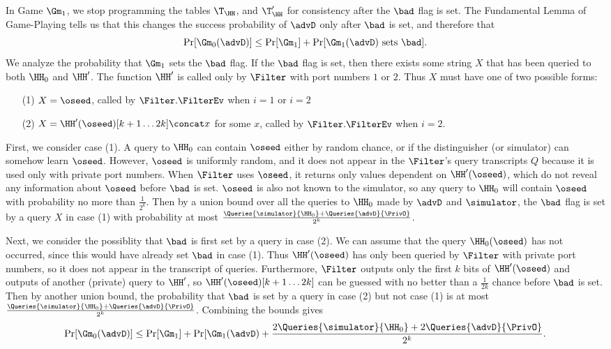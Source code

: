 	In Game $\Gm_1$, we stop programming the tables $\T_\HH$, and $\T_\HH^{\prime}$ for consistency after the $\bad$ flag is set.
	The Fundamental Lemma of Game-Playing tells us that this changes the success probability of $\advD$ only after $\bad$ is set, and therefore that
	\[ \Pr[\Gm_0(\advD)] \leq \Pr[\Gm_1] + \Pr[\Gm_1(\advD) \text{ sets } \bad]. \]
	We analyze the probability that $\Gm_1$ sets the $\bad$ flag.
	If the $\bad$ flag is set, then there exists some string $X$ that has been queried to both $\HH_0$ and $\HH^{\prime}$.
	The function $\HH^{\prime}$ is called only by $\Filter$ with port numbers $1$ or $2$.
	Thus $X$ must have one of two possible forms: 
	\begin{enumerate}
		\item[(1)] $X = \oseed$, called by $\Filter.\FilterEv$ when $i=1$ or $i = 2$
		\item[(2)] $X = \HH^{\prime}(\oseed)[k+1 \ldots 2k] \concat x$ for some $x$, called by $\Filter.\FilterEv$ when $i=2$.
	\end{enumerate}
	First, we consider case (1). A query to $\HH_0$ can contain $\oseed$ either by random chance, or if the distinguisher (or simulator) can somehow learn $\oseed$. 
	However, $\oseed$ is uniformly random, and it does not appear in the $\Filter$'s query transcripts $Q$ because it is used only with private port numbers. 
	When $\Filter$ uses $\oseed$, it returns only values dependent on $\HH^{\prime}(\oseed)$, which do not reveal any information about $\oseed$ before $\bad$ is set. 
	$\oseed$ is also not known to the simulator, so any query to $\HH_0$ will contain $\oseed$ with probability no more than $\frac{1}{2^{k}}$.
	Then by a union bound over all the queries to $\HH_0$ made by $\advD$ and $\simulator$, the $\bad$ flag is set by a query $X$ in case (1) with probability at most $\frac{\Queries{\simulator}{\HH_0} + \Queries{\advD}{\PrivO}}{2^k}$.
	
	Next, we consider the possiblity that $\bad$ is first set by a query in case (2). 
	We can assume that the query $\HH_0(\oseed)$ has not occurred, since this would have already set $\bad$ in case (1).
	Thus $\HH^{\prime}(\oseed)$ has only been queried by $\Filter$ with private port numbers, so it does not appear in the transcript of queries.
	Furthermore, $\Filter$ outputs only the first $k$ bits of $\HH^{\prime}(\oseed)$ and outputs of another (private) query to $\HH^{\prime}$, so $\HH^{\prime}(\oseed)[k+1 \ldots 2k]$ can be guessed with no better than a $\frac{1}{2k}$ chance before $\bad$ is set.
	Then by another union bound, the probability that $\bad$ is set by a query in case (2) but not case (1) is at most $\frac{\Queries{\simulator}{\HH_0} + \Queries{\advD}{\PrivO}}{2^k}$. 
	Combining the bounds gives
	\[ \Pr[\Gm_0(\advD)] \leq \Pr[\Gm_1] + \Pr[\Gm_1(\advD) + \frac{2\Queries{\simulator}{\HH_0}+ 2\Queries{\advD}{\PrivO}}{2^k}.\]
	

